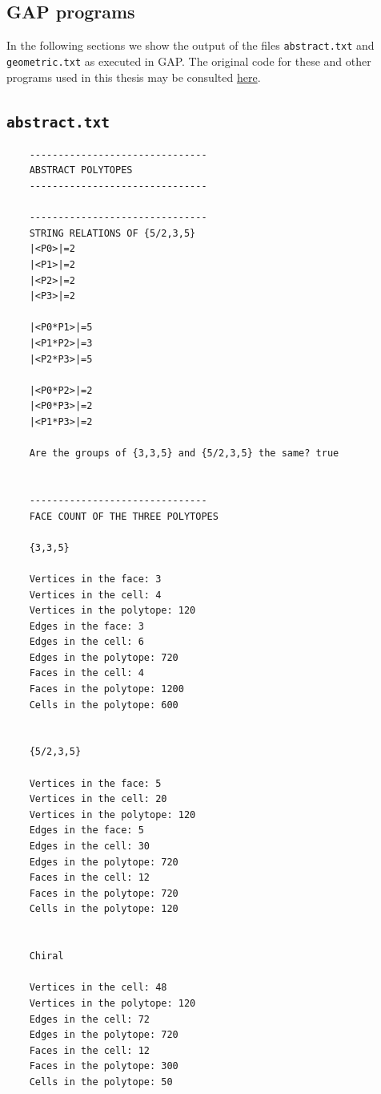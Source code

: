 \documentclass{article}
\theoremstyle{definition}
\begin{document}
\clearpage
\begin{appendices}
\section{GAP programs}
In the following sections we show the output of the files \texttt{abstract.txt} and \texttt{geometric.txt} as executed in GAP. The original code for these and other programs used in this thesis may be consulted \href{https://github.com/danimalabares/tesina}{here}.

\subsection{\texttt{abstract.txt}}\label{app:1}

\begin{changemargin}{-2cm}{-2cm}
\begin{multicols}{2}
\begin{lstlisting}
	-------------------------------
	ABSTRACT POLYTOPES
	-------------------------------
	
	-------------------------------
	STRING RELATIONS OF {5/2,3,5}
	|<P0>|=2
	|<P1>|=2
	|<P2>|=2
	|<P3>|=2
	
	|<P0*P1>|=5
	|<P1*P2>|=3
	|<P2*P3>|=5
	
	|<P0*P2>|=2
	|<P0*P3>|=2
	|<P1*P3>|=2
	
	Are the groups of {3,3,5} and {5/2,3,5} the same? true
	
	
	-------------------------------
	FACE COUNT OF THE THREE POLYTOPES
	
	{3,3,5}
	
	Vertices in the face: 3
	Vertices in the cell: 4
	Vertices in the polytope: 120
	Edges in the face: 3
	Edges in the cell: 6
	Edges in the polytope: 720
	Faces in the cell: 4
	Faces in the polytope: 1200
	Cells in the polytope: 600
	
	
	{5/2,3,5}
	
	Vertices in the face: 5
	Vertices in the cell: 20
	Vertices in the polytope: 120
	Edges in the face: 5
	Edges in the cell: 30
	Edges in the polytope: 720
	Faces in the cell: 12
	Faces in the polytope: 720
	Cells in the polytope: 120
	
	
	Chiral
	
	Vertices in the cell: 48
	Vertices in the polytope: 120
	Edges in the cell: 72
	Edges in the polytope: 720
	Faces in the cell: 12
	Faces in the polytope: 300
	Cells in the polytope: 50
	

\end{lstlisting}
\end{multicols}
\end{changemargin}
\end{appendices}
\end{document}
